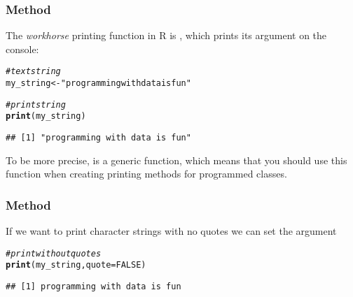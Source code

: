 \documentclass[12pt]{beamer}\usepackage[]{graphicx}\usepackage[]{color}
\makeatletter
\newcommand{\hlnum}[1]{\textcolor[rgb]{0.686,0.059,0.569}{#1}}%
\newcommand{\hlstr}[1]{\textcolor[rgb]{0.192,0.494,0.8}{#1}}%
\newcommand{\hlcom}[1]{\textcolor[rgb]{0.678,0.584,0.686}{\textit{#1}}}%
\newcommand{\hlstd}[1]{\textcolor[rgb]{0.345,0.345,0.345}{#1}}%
\newcommand{\hlkwb}[1]{\textcolor[rgb]{0.69,0.353,0.396}{#1}}%
\newcommand{\hlkwc}[1]{\textcolor[rgb]{0.333,0.667,0.333}{#1}}%
\newcommand{\hlkwd}[1]{\textcolor[rgb]{0.737,0.353,0.396}{\textbf{#1}}}%
\newenvironment{kframe}{%
 \def\at@end@of@kframe{}%
 \ifinner\ifhmode%
  \def\at@end@of@kframe{\end{minipage}}%
  \begin{minipage}{\columnwidth}%
 \fi\fi%
 \def\FrameCommand##1{\hskip\@totalleftmargin \hskip-\fboxsep
 \colorbox{shadecolor}{##1}\hskip-\fboxsep
     \hskip-\linewidth \hskip-\@totalleftmargin \hskip\columnwidth}%
 \MakeFramed {\advance\hsize-\width
   \@totalleftmargin\z@ \linewidth\hsize
   \@setminipage}}%
 {\par\unskip\endMakeFramed%
 \at@end@of@kframe}
\newenvironment{knitrout}{}{} %
\makeatother
\begin{document}

\begin{frame}[fragile]
\frametitle{Method }

The \textit{workhorse} printing function in R is {\hilit {}}, which prints its argument on the console:
\begin{knitrout}\footnotesize
{}\color{fgcolor}\begin{kframe}
\begin{alltt}
\hlcom{# text string}
\hlstd{my_string} \hlkwb{<-} \hlstr{"programming with data is fun"}

\hlcom{# print string}
\hlkwd{print}\hlstd{(my_string)}
\end{alltt}
\begin{verbatim}
## [1] "programming with data is fun"
\end{verbatim}
\end{kframe}
\end{knitrout}
To be more precise,  is a generic function, which means that you should use this function when creating printing methods for programmed classes.

\end{frame}


\begin{frame}[fragile]
\frametitle{Method }

If we want to print character strings with no quotes 
we can set the argument  
\begin{knitrout}\footnotesize
{}\color{fgcolor}\begin{kframe}
\begin{alltt}
\hlcom{# print without quotes}
\hlkwd{print}\hlstd{(my_string,} \hlkwc{quote} \hlstd{=} \hlnum{FALSE}\hlstd{)}
\end{alltt}
\begin{verbatim}
## [1] programming with data is fun
\end{verbatim}
\end{kframe}
\end{knitrout}

\end{frame}

\end{document}
